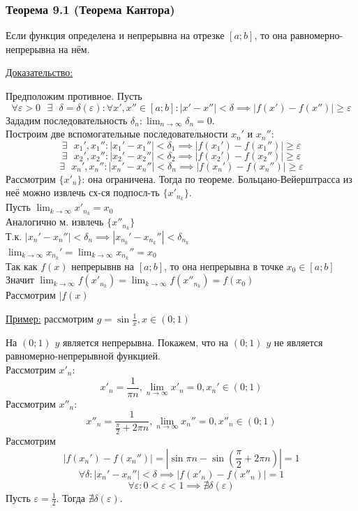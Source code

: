 \documentclass[12pt]{article}
\def\posl#1#2{\{#1_{#2}\}}
\begin{document}
    \subsubsection*{Теорема 9.1 (Теорема Кантора)}
    Если функция определена и непрерывна на отрезке $[a; b]$, то она равномерно-непрерывна на нём.\par\noindent
    \underline{Доказательство:}
    \begin{adjustwidth}{1.5em}{1.5em}
        Предположим противное. Пусть \[\forall \varepsilon > 0 \text{ } \exists \text{ } \delta = \delta(\varepsilon) : \forall x', x'' \in [a;b] :  |x' - x''| < \delta \implies |f(x') - f(x'')| \ge \varepsilon \]
        Зададим последовательность $\delta_n : \lim_{n\to\infty} \delta_n = 0$.\\
        Построим две вспомогательные последовательности $x_n'$ и $x_n''$:
        \[ \exists \text{ } x_1', x_1'' : |x_1' - x_1''| < \delta_1 \implies |f(x_1') - f(x_1'')| \ge \varepsilon \]
        \[ \exists \text{ } x_2', x_2'' : |x_2' - x_2''| < \delta_2 \implies |f(x_2') - f(x_2'')| \ge \varepsilon \]
        \[ \exists \text{ } x_n', x_n'' : |x_n' - x_n''| < \delta_n \implies |f(x_n') - f(x_n'')| \ge \varepsilon \]
        Рассмотрим $\posl{x'}{n}$: она ограничена. Тогда по теореме. Больцано-Вейерштрасса из неё можно извлечь сх-ся подпосл-ть $\posl{x'}{n_k}$.\\
        Пусть $\lim_{k\to\infty} x'_{n_k} = x_0$\\
        Аналогично м. извлечь $\posl{x''}{n_k}$\\
        Т.к. $|x_n' - x_n''| < \delta_n \implies |x_{n_k}' - x_{n_k}''| < \delta_{n_k}$\\
        $\lim_{k\to\infty}x_{n_k}' = \lim_{k\to\infty}x_{n_k}'' = x_0$\\
        Так как $f(x)$ непрерывнв на $[a; b]$, то она непрерывна в точке $x_0 \in [a;b]$\\
        Значит $\lim_{k\to\infty}f(x'_{n_k}) = \lim_{k\to\infty}f(x''_{n_k}) = f(x_0)$\\
        Рассмотрим $|f(x)$
    \end{adjustwidth}
    \underline{Пример:} рассмотрим $g = \sin \frac{1}{x}, x \in (0; 1)$
    \begin{adjustwidth}{1.5em}{1.5em}
        На $(0; 1)$ $y$ является непрерывна. Покажем, что на $(0; 1)$ $y$ не является равномерно-непрерывной функцией.\\
        Рассмотрим $x'_n$:
        \[x'_n = \frac{1}{\pi n}, \lim_{n\to\infty} x'_n = 0, x_n' \in (0; 1)\]
        Рассмотрим $x''_n$: 
        \[x''_n = \frac{1}{\frac{\pi}{2}+2\pi n}, \lim_{n\to\infty}x_n'' = 0, x''_n \in (0; 1)\]
        Рассмотрим 
        \[|f(x_n') - f(x_n'')| = |\sin \pi n - \sin (\frac{\pi}{2} + 2\pi n)| = 1\]
        \[ \forall \delta : |x_n' - x_n''| < \delta \implies |f(x'_n) - f(x''_n)| = 1 \]
        \[ \forall \varepsilon : 0 < \varepsilon < 1 \implies \nexists \delta(\varepsilon) \]
        Пусть $\varepsilon = \frac{1}{2}$. Тогда $\nexists \delta(\varepsilon)$.
    \end{adjustwidth}
\end{document}
